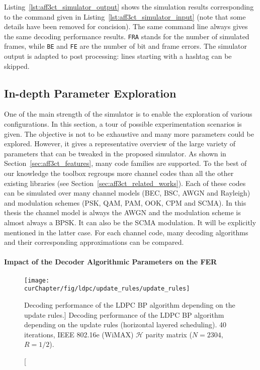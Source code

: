 \begin{listing}[htp]
  \inputminted[frame=lines,linenos]{console}{\curChapter/src/use_cases/simulator/output.txt}
  \caption{Example of an \AFFECT simulator output.}
  \label{lst:aff3ct_simulator_output}
\end{listing}

Listing~\ref{lst:aff3ct_simulator_output} shows the simulation results
corresponding to the \AFFECT command given in
Listing~\ref{lst:aff3ct_simulator_input} (note that some details have been
removed for concision). The same command line always gives the same decoding
performance results. \verb|FRA| stands for the number of simulated frames,
while \verb|BE| and \verb|FE| are the number of bit and frame errors. The
simulator output is adapted to post processing: lines starting with a hashtag
can be skipped.

\subsection{In-depth Parameter Exploration}

One of the main strength of the \AFFECT simulator is to enable the exploration
of various configurations. In this section, a tour of possible experimentation
scenarios is given. The objective is not to be exhaustive and many more
parameters could be explored. However, it gives a representative overview of the
large variety of parameters that can be tweaked in the proposed simulator. As
shown in Section~\ref{sec:aff3ct_features}, many code families are supported. To
the best of our knowledge the \AFFECT toolbox regroups more channel codes than
all the other existing libraries (see Section~\ref{sec:aff3ct_related_works}).
Each of these codes can be simulated over many channel models (BEC, BSC, AWGN
and Rayleigh) and modulation schemes (PSK, QAM, PAM, OOK, CPM and SCMA). In this
thesis the channel model is always the AWGN and the modulation scheme is almost
always a BPSK. It can also be the SCMA modulation. It will be explicitly
mentioned in the latter case. For each channel code, many decoding algorithms
and their corresponding approximations can be compared.

\paragraph{Impact of the Decoder Algorithmic Parameters on the FER}

\begin{figure}[htp]
  \centering
  \texttt{[image: \\curChapter/fig/ldpc/update\_rules/update\_rules]}
  \caption
    [Decoding performance of the LDPC BP algorithm depending on the update
     rules.]
    {Decoding performance of the LDPC BP algorithm depending on the update rules
     (horizontal layered scheduling). 40 iterations, IEEE 802.16e (WiMAX)
     $\mathcal{H}$ parity matrix ($N=2304$, $R=1/2$).}
  \label{plot:aff3ct_ldpc_update_rules}
\end{figure}

